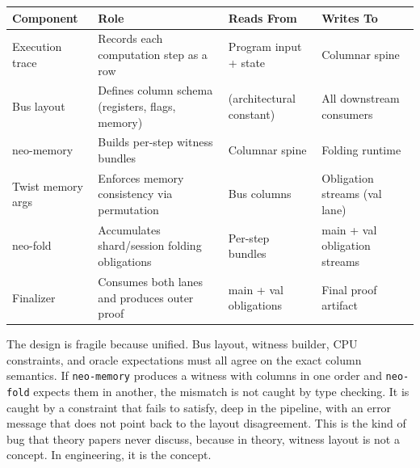 \documentclass[
  11pt,
  openany]{report}
\begin{document}
\begin{longtable}[]{@{}
  >{\raggedright\arraybackslash}p{}
  >{\raggedright\arraybackslash}p{}
  >{\raggedright\arraybackslash}p{}
  >{\raggedright\arraybackslash}p{}@{}}
\toprule\noalign{}
\begin{minipage}[b]{\linewidth}\raggedright
Component
\end{minipage} & \begin{minipage}[b]{\linewidth}\raggedright
Role
\end{minipage} & \begin{minipage}[b]{\linewidth}\raggedright
Reads From
\end{minipage} & \begin{minipage}[b]{\linewidth}\raggedright
Writes To
\end{minipage} \\
\midrule\noalign{}
\arrayrulecolor{MidnightBlue}\midrule\arrayrulecolor{MidnightBorder}
\endhead
\bottomrule\noalign{}
\endlastfoot
Execution trace & Records each computation step as a row & Program input + state
& Columnar spine \\
Bus layout & Defines column schema (registers, flags, memory) & (architectural
constant) & All downstream consumers \\
neo-memory & Builds per-step witness bundles & Columnar spine & Folding
runtime \\
Twist memory args & Enforces memory consistency via permutation & Bus columns &
Obligation streams (val lane) \\
neo-fold & Accumulates shard/session folding obligations & Per-step bundles &
main + val obligation streams \\
Finalizer & Consumes both lanes and produces outer proof & main + val
obligations & Final proof artifact \\
\end{longtable}

The design is fragile because unified. Bus layout, witness builder, CPU
constraints, and oracle expectations must all agree on the exact column
semantics. If \texttt{neo-memory} produces a witness with columns in one order
and \texttt{neo-fold} expects them in another, the mismatch is not caught by
type checking. It is caught by a constraint that fails to satisfy, deep in the
pipeline, with an error message that does not point back to the layout
disagreement. This is the kind of bug that theory papers never discuss, because
in theory, witness layout is not a concept. In engineering, it is the concept.
\end{document}
